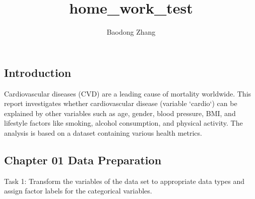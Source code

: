 \documentclass[
  letterpaper,
  DIV=11,
  numbers=noendperiod]{scrartcl}
\title{home\_work\_test}
\author{Baodong Zhang}
\date{}
\begin{document}
\maketitle


\subsection{Introduction}\label{introduction}

Cardiovascular diseases (CVD) are a leading cause of mortality
worldwide. This report investigates whether cardiovascular disease
(variable `cardio`) can be explained by other variables such as age,
gender, blood pressure, BMI, and lifestyle factors like smoking, alcohol
consumption, and physical activity. The analysis is based on a dataset
containing various health metrics.

\newpage

\subsection{Chapter 01 Data
Preparation}\label{chapter-01-data-preparation}

Task 1: Transform the variables of the data set to appropriate data
types and assign factor labels for the categorical variables.
\end{document}
